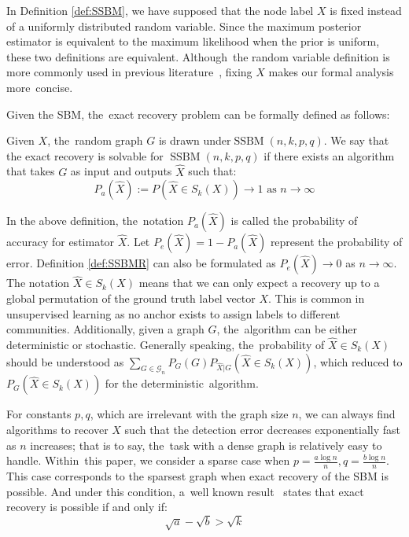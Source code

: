 \documentclass[entropy,article,accept,moreauthors,pdftex]{Definitions/mdpi}
\newcommand{\A}{\frac{a \log n}{n}}
\newcommand{\B}{\frac{b \log n}{n}}
\newcommand{\cG}{\mathcal{G}}
\newcommand{\1}{\mathbbm{1}}
\DeclareMathOperator{\SSBM}{SSBM}
\begin{document}
In Definition \ref{def:SSBM}, we have supposed that the node label $X$ is fixed instead of a uniformly distributed random variable.
Since the maximum posterior estimator is equivalent to the maximum likelihood when the prior is uniform,
these two definitions are equivalent. Although~the random variable definition is more commonly used in previous literature~\cite{abbe2017community}, fixing $X$ makes our formal analysis more~concise.

Given the SBM, the~exact recovery problem can be formally defined as follows:
\begin{Definition} \label{def:SSBMR}
Given $X$, the~random graph $G$ is drawn under\linebreak $\SSBM(n,k,p,q)$. We say that the exact recovery is solvable for $\SSBM(n,k,p,q)$ if there exists an algorithm that takes
$G$ as input and outputs $\hat{X}$ such that:
\begin{equation*}
P_a(\hat{X}):=P(\hat{X} \in S_k(X)) \to 1 \textrm{ as } n \to \infty
\end{equation*}
\end{Definition}

In the above definition, the~notation $P_a(\hat{X})$ is called the probability of accuracy for estimator $\hat{X}$.
Let $P_e(\hat{X}) = 1 - P_a(\hat{X})$ represent the probability of error. Definition \ref{def:SSBMR} can also
be formulated as $P_e(\hat{X}) \to 0$ as $n\to \infty$.
The notation $\hat{X} \in S_k(X)$ means that we can only
expect a recovery up to a global permutation of the ground truth label vector $X$. This is common in unsupervised
learning as no anchor exists to assign labels to different communities.
Additionally, given a graph $G$, the~algorithm can
be either deterministic or stochastic. Generally speaking, the~probability of $\hat{X} \in S_k(X)$ should be understood as 
$\sum_{G \in \cG_n} P_G(G) P_{\hat{X}|G}(\hat{X} \in S_k(X))$, which reduced to 
$P_G(\hat{X} \in S_k(X))$ for the deterministic~algorithm.

For constants $p,q$, which are irrelevant with the graph size $n$,
we can always find algorithms to recover $X$ such that the detection error decreases exponentially
fast as $n$ increases; that is to say, the~task with a dense graph is relatively easy to handle. Within~this paper, we consider a sparse
case when $p = \A, q = \B$. This case corresponds to the sparsest graph when exact recovery of the SBM is possible.
And under this condition, a~well known result~\cite{abbe2015community} states that
exact recovery is possible if and only if:
\begin{equation}\label{eq:abk}
\sqrt{a} - \sqrt{b} > \sqrt{k}
\end{equation}
\end{document}
